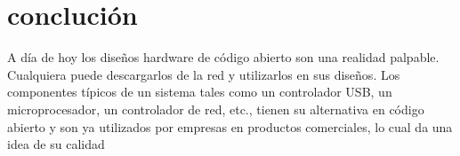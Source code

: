 \section{conclución}

A día de hoy los diseños hardware de código abierto son una realidad palpable. Cualquiera puede descargarlos de la red y utilizarlos en sus diseños. Los componentes típicos de un sistema tales como un controlador USB, un microprocesador, un controlador de red, etc., tienen su alternativa en código abierto y son ya utilizados por empresas en productos comerciales, lo cual da una idea de su calidad




\begin{figure}[h!]
 \begin{center}
  \label{fig:esquema}
 \end{center}
\end{figure}




